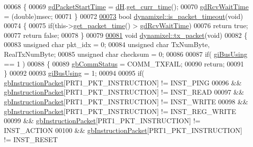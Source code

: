 \begin{DoxyCode}
00068 \{
00069     \hyperlink{a00003_a6c6314fb7070e6fd361e57c5de17e0ec}{gdPacketStartTime} = \hyperlink{a00003_ae003cc90ada6d7b70eaa4ea9d42d4deb}{dH}.\hyperlink{a00002_a6b6b7381c45308662fc3df6e7f74bc61}{get\_curr\_time}();
00070     \hyperlink{a00003_a9f47887864517d74955a2bc787ae4456}{gdRcvWaitTime} = (double)msec;
00071 \}
00072 
\hypertarget{a00012_source_l00073}{}\hyperlink{a00003_a00d08481ebc4dee19debecf43f888522}{00073} \textcolor{keywordtype}{bool} \hyperlink{a00003_a00d08481ebc4dee19debecf43f888522}{dynamixel::is\_packet\_timeout}(\textcolor{keywordtype}{void})
00074 \{
00075     \textcolor{keywordflow}{if}(this->\hyperlink{a00003_a2fa5375537184c279a9ebfcfc0425071}{get\_packet\_time}() > \hyperlink{a00003_a9f47887864517d74955a2bc787ae4456}{gdRcvWaitTime})
00076         \textcolor{keywordflow}{return} \textcolor{keyword}{true};
00077     \textcolor{keywordflow}{return} \textcolor{keyword}{false};
00078 \}
00079 
\hypertarget{a00012_source_l00081}{}\hyperlink{a00003_a479187cd8940c16dd4374eb5be22b888}{00081} \textcolor{keywordtype}{void} \hyperlink{a00003_a479187cd8940c16dd4374eb5be22b888}{dynamixel::tx\_packet}(\textcolor{keywordtype}{void})
00082 \{
00083     \textcolor{keywordtype}{unsigned} \textcolor{keywordtype}{char} pkt\_idx = 0;
00084     \textcolor{keywordtype}{unsigned} \textcolor{keywordtype}{char} TxNumByte, RealTxNumByte;
00085     \textcolor{keywordtype}{unsigned} \textcolor{keywordtype}{char} checksum = 0;
00086 
00087     \textcolor{keywordflow}{if}( \hyperlink{a00003_ad10e0e49f5fef04bf789a89c14cc470a}{giBusUsing} == 1 )
00088     \{
00089         \hyperlink{a00003_a5b603f6bed7ccc595f1f50bd6a6ebbfc}{gbCommStatus} = COMM\_TXFAIL;
00090         \textcolor{keywordflow}{return};
00091     \}
00092     
00093     \hyperlink{a00003_ad10e0e49f5fef04bf789a89c14cc470a}{giBusUsing} = 1;
00094     
00095     \textcolor{keywordflow}{if}( \hyperlink{a00003_afd94dcf01b8e96298727776e222de722}{gbInstructionPacket}[PRT1\_PKT\_INSTRUCTION] != INST\_PING
00096         && \hyperlink{a00003_afd94dcf01b8e96298727776e222de722}{gbInstructionPacket}[PRT1\_PKT\_INSTRUCTION] != INST\_READ
00097         && \hyperlink{a00003_afd94dcf01b8e96298727776e222de722}{gbInstructionPacket}[PRT1\_PKT\_INSTRUCTION] != INST\_WRITE
00098         && \hyperlink{a00003_afd94dcf01b8e96298727776e222de722}{gbInstructionPacket}[PRT1\_PKT\_INSTRUCTION] != INST\_REG\_WRITE
00099         && \hyperlink{a00003_afd94dcf01b8e96298727776e222de722}{gbInstructionPacket}[PRT1\_PKT\_INSTRUCTION] != INST\_ACTION
00100         && \hyperlink{a00003_afd94dcf01b8e96298727776e222de722}{gbInstructionPacket}[PRT1\_PKT\_INSTRUCTION] != INST\_RESET

\end{DoxyCode}
